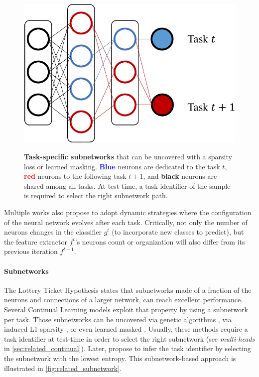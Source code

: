\begin{figure}[tb]
      \begin{center}
            {\includegraphics[width=0.5\linewidth]{images/related/subnetworks.pdf}}
      \end{center}
      \caption{\textbf{Task-specific subnetworks} that can be uncovered with a sparsity loss or
            learned masking. \textcolor{blue}{\textbf{Blue}} neurons are dedicated to
            the task $t$, \textcolor{red}{\textbf{red}} neurons to the following task
            $t+1$, and \textbf{black} neurons are shared among all tasks. At
            test-time, a task identifier of the sample is required to select the
            right subnetwork path.}
      \label{fig:related_subnetwork}
\end{figure}

Multiple works also propose to adopt dynamic strategies where the configuration of the neural
network evolves after each task. Critically, not only the number of neurons changes in the classifier $g^t$
(to incorporate new classes to predict), but the feature extractor $f^t$'s neurons count or organization
will also differ from its previous iteration $f^{t-1}$.


\paragraph{Subnetworks} The Lottery Ticket Hypothesis \citep{frankle2019lottery_ticket} states that
subnetworks made of a fraction of the neurons and connections of a larger network, can reach
excellent performance. Several Continual Learning models exploit that property by using a
subnetwork per task. Those subnetworks can be uncovered via genetic algorithms
\citep{fernando2017path_net}, via induced L1 sparsity \citep{golkar2019neural_pruning}, or even
learned masked \cite{serra2018hat,hung2019cpg}. Usually, these methods require a task identifier at
test-time in order to select the right subnetwork (see \textit{multi-heads} in
\autoref{sec:related_continual}). Later, \cite{wortsman2020supermasks} propose to infer the task
identifier by selecting the subnetwork with the lowest entropy. This subnetwork-based approach is
illustrated in \autoref{fig:related_subnetwork}.


